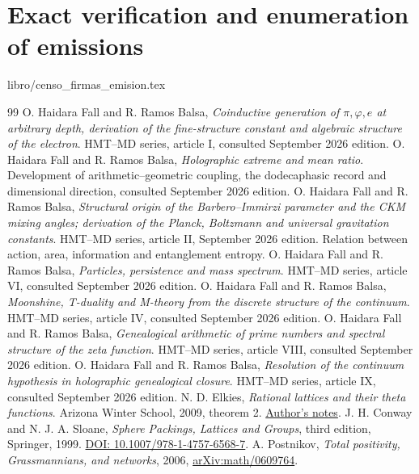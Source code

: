 \documentclass[a4paper,10pt]{article}
\theoremstyle{definition}\newtheorem{definition}[theorem]{Definition}
\theoremstyle{remark}\newtheorem{remark}[theorem]{Remark}
\numberwithin{equation}{section}
\begin{document}
\clearpage
\part{Exact verification and enumeration of emissions}

{libro/censo_firmas_emision.tex}


\begin{thebibliography}{99}
 O. Haidara Fall and R. Ramos Balsa,
\emph{Coinductive generation of \(\pi,\varphi,e\) at arbitrary depth,
derivation of the fine-structure constant and algebraic structure of the
electron}. HMT--MD series, article I, consulted September 2026 edition.
 O. Haidara Fall and R. Ramos Balsa,
\emph{Holographic extreme and mean ratio}. Development of arithmetic--geometric
coupling, the dodecaphasic record and dimensional direction,
consulted September 2026 edition.
 O. Haidara Fall and R. Ramos Balsa,
\emph{Structural origin of the Barbero--Immirzi parameter and the
CKM mixing angles; derivation of the Planck, Boltzmann
and universal gravitation constants}. HMT--MD series, article II, September
2026 edition. Relation between action, area, information and entanglement
entropy.
 O. Haidara Fall and R. Ramos Balsa,
\emph{Particles, persistence and mass spectrum}. HMT--MD series, article VI,
consulted September 2026 edition.
 O. Haidara Fall and R. Ramos Balsa,
\emph{Moonshine, T-duality and M-theory from the discrete structure of the
continuum}. HMT--MD series, article IV, consulted September 2026 edition.
 O. Haidara Fall and R. Ramos Balsa,
\emph{Genealogical arithmetic of prime numbers and spectral structure
of the zeta function}. HMT--MD series, article VIII, consulted September 2026 edition.
 O. Haidara Fall and R. Ramos Balsa,
\emph{Resolution of the continuum hypothesis in holographic genealogical
closure}. HMT--MD series, article IX, consulted September 2026 edition.
 N. D. Elkies,
\emph{Rational lattices and their theta functions}. Arizona Winter School,
2009, theorem 2.
\href{https://people.math.harvard.edu/~elkies/aws09.pdf}{Author's notes}.
 J. H. Conway and N. J. A. Sloane,
\emph{Sphere Packings, Lattices and Groups}, third edition, Springer, 1999.
\href{https://doi.org/10.1007/978-1-4757-6568-7}{DOI: 10.1007/978-1-4757-6568-7}.
 A. Postnikov,
\emph{Total positivity, Grassmannians, and networks}, 2006,
\href{https://arxiv.org/abs/math/0609764}{arXiv:math/0609764}.

\end{thebibliography}
\end{document}
